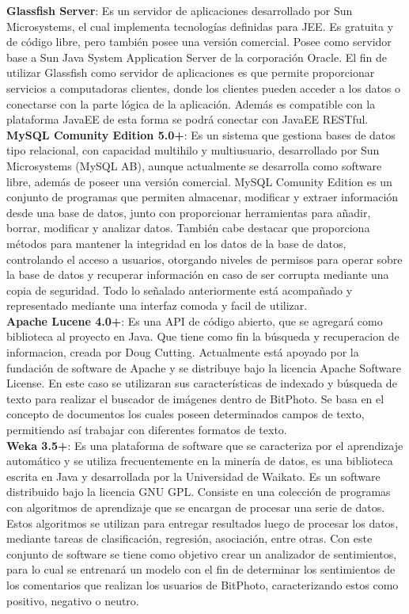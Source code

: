 \documentclass{memoria}
\begin{document}

\textbf{Glassfish Server}: Es un servidor de aplicaciones desarrollado por Sun Microsystems, el cual implementa tecnologías definidas para JEE. Es gratuita y de código libre, pero también posee una versión comercial. Posee como servidor base a Sun Java System Application Server de la corporación Oracle. El fin de utilizar Glassfish como servidor de aplicaciones es que permite proporcionar servicios a computadoras clientes, donde los clientes pueden acceder a los datos o conectarse con la parte lógica de la aplicación. Además es compatible con la plataforma JavaEE de esta forma se podrá conectar con JavaEE RESTful.\\

\textbf{MySQL Comunity Edition 5.0+}: Es un sistema que gestiona bases de datos tipo relacional, con capacidad multihilo y multiusuario, desarrollado por Sun Microsystems (MySQL AB), aunque actualmente se desarrolla como software libre, además de poseer una versión comercial. MySQL Comunity Edition es un conjunto de programas que permiten almacenar, modificar y extraer información desde una base de datos, junto con proporcionar herramientas para añadir, borrar, modificar y analizar datos. También cabe destacar que proporciona métodos para mantener la integridad en los datos de la base de datos, controlando el acceso a usuarios, otorgando niveles de permisos para operar sobre la base de datos y recuperar información en caso de ser corrupta mediante una copia de seguridad. Todo lo señalado anteriormente está acompañado y representado mediante una interfaz comoda y facil de utilizar.\\

\textbf{Apache Lucene 4.0+}: Es una API de código abierto, que se agregará como biblioteca al proyecto en Java. Que tiene como fin la búsqueda y recuperacion de informacion, creada por Doug Cutting. Actualmente está apoyado por la fundación de software de Apache y se distribuye bajo la licencia Apache Software License. En este caso se utilizaran sus características de indexado y búsqueda de texto para realizar el buscador de imágenes dentro de BitPhoto. Se basa en el concepto de documentos los cuales poseen determinados campos de texto, permitiendo así trabajar con diferentes formatos de texto.\\

\textbf{Weka 3.5+}: Es una plataforma de software que se caracteriza por el aprendizaje automático y se utiliza frecuentemente en la minería de datos, es una biblioteca escrita en Java y desarrollada por la Universidad de Waikato. Es un software distribuido bajo la licencia GNU GPL. Consiste en una colección de programas con algoritmos de aprendizaje que se encargan de procesar una serie de datos. Estos algoritmos se utilizan para entregar resultados luego de procesar los datos, mediante tareas de clasificación, regresión, asociación, entre otras. Con este conjunto de software se tiene como objetivo crear un analizador de sentimientos, para lo cual se entrenará un modelo con el fin de determinar los sentimientos de los comentarios que realizan los usuarios de BitPhoto, caracterizando estos como positivo, negativo o neutro.\\
\end{document}
